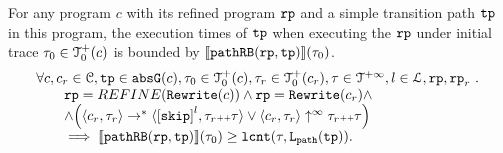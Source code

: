 \begin{lemma}
  For any program $c$ with its refined program $\mathtt{rp}$ and a simple transition path $\mathtt{tp}$ in this program,
  the execution times of $\mathtt{tp}$ when executing the $\mathtt{rp}$ under initial trace $\mathtt{\tau}_0 \in \mathcal{T}^{+}_0(c)$ is bounded by $\llbracket \mathtt{pathRB}(\mathtt{rp}, \mathtt{tp}) \rrbracket(\mathtt{\tau}_0)$.
  \[
    \begin{array}{l}
    \forall c, c_r \in \cdom, \tpath \in \absG(c), \trace_0 \in \ftdom_0(c),  \trace_r \in \ftdom_0(c_r), \trace \in \tdom, l \in \ldom, \rprog, \rprog_r \st 
    \\ \qquad
    \rprog = REFINE(\algrewrite(c))
    \land 
    \rprog = \algrewrite(c_r)
    \land
    \\ \qquad
    \land 
    \Big(
      \config{c_r, \trace_r} \rightarrow^* \config{\clabel{\eskip}^{l}, \trace_r \tracecat \trace}
      \lor \config{c_r, \trace_r} \uparrow^{\infty} \trace_r \tracecat \trace 
      \Big)
  \\ \qquad
    \implies
    \econfig{\inoutB(\rprog, \tpath)}(\trace_0) \geq \lcounter(\trace, \pathl(\tpath)).
    \end{array}
  \]
\end{lemma}
%
